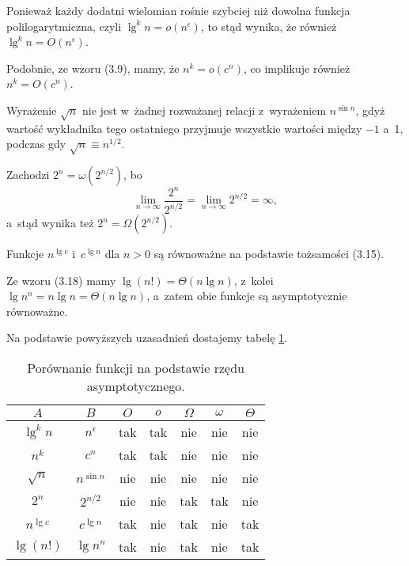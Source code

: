 
\subproblem %
Ponieważ każdy dodatni wielomian rośnie szybciej niż dowolna funkcja polilogarytmiczna, czyli $\lg^kn=o(n^\epsilon)$, to stąd wynika, że również $\lg^kn=O(n^\epsilon)$.

\subproblem %
Podobnie, ze wzoru (3.9), mamy, że $n^k=o(c^n)$, co implikuje również $n^k=O(c^n)$.

\subproblem %
Wyrażenie $\sqrt{n}$ nie jest w~żadnej rozważanej relacji z~wyrażeniem $n^{\sin n}$, gdyż wartość wykładnika tego ostatniego przyjmuje wszystkie wartości między $-1$ a~1, podczas gdy $\sqrt{n}\equiv n^{1/2}$.

\subproblem %
Zachodzi $2^n=\omega(2^{n/2})$, bo
\[
	\lim_{n\to\infty}\frac{2^n}{2^{n/2}} = \lim_{n\to\infty}2^{n/2} = \infty,
\]
a~stąd wynika też $2^n=\Omega(2^{n/2})$.

\subproblem %
Funkcje $n^{\lg c}$ i~$c^{\lg n}$ dla $n>0$ są równoważne na podstawie tożsamości (3.15).

\subproblem %
Ze wzoru (3.18) mamy $\lg(n!)=\Theta(n\lg n)$, z~kolei $\lg n^n=n\lg n=\Theta(n\lg n)$, a~zatem obie funkcje są asymptotycznie równoważne.

\bigskip
\noindent Na podstawie powyższych uzasadnień dostajemy tabelę \ref{tab:3-2}.
\begin{table}[!ht]
	\centering
		\begin{tabular}{cc|c|c|c|c|c}
			$A$ & $B$ & $O$ & $o$ & $\Omega$ & $\omega$ & $\Theta$ \\
			\hline
			$\lg^kn$ & $n^\epsilon$ & tak & tak & nie & nie & nie \\
			\hline
			$n^k$ & $c^n$ & tak & tak & nie & nie & nie \\
			\hline
			$\sqrt{n}$ & $n^{\sin n}$ & nie & nie & nie & nie & nie \\
			\hline
			$2^n$ & $2^{n/2}$ & nie & nie & tak & tak & nie \\
			\hline
			$n^{\lg c}$ & $c^{\lg n}$ & tak & nie & tak & nie & tak \\
			\hline
			$\lg(n!)$ & $\lg n^n$ & tak & nie & tak & nie & tak
		\end{tabular}
		\caption{Porównanie funkcji na podstawie rzędu asymptotycznego.} \label{tab:3-2}
\end{table}
